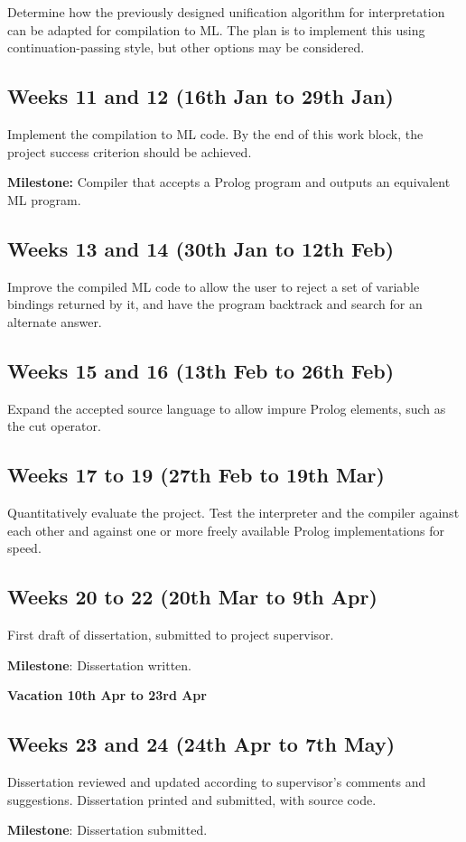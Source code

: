 \documentclass[12pt]{article}
\begin{document}
Determine how the previously designed unification algorithm for interpretation can be adapted for compilation to ML. The plan is to implement this using continuation-passing style, but other options may be considered.

\subsection*{Weeks 11 and 12 (16th Jan to 29th Jan)}

Implement the compilation to ML code. By the end of this work block, the project success criterion should be achieved.

\textbf{Milestone:} Compiler that accepts a Prolog program and outputs an equivalent ML program.

\subsection*{Weeks 13 and 14 (30th Jan to 12th Feb)}

Improve the compiled ML code to allow the user to reject a set of variable bindings returned by it, and have the program backtrack and search for an alternate answer.

\subsection*{Weeks 15 and 16 (13th Feb to 26th Feb)}

Expand the accepted source language to allow impure Prolog elements, such as the cut operator.

\subsection*{Weeks 17 to 19 (27th Feb to 19th Mar)}

Quantitatively evaluate the project. Test the interpreter and the compiler against each other and against one or more freely available Prolog implementations for speed.

\subsection*{Weeks 20 to 22 (20th Mar to 9th Apr)}

First draft of dissertation, submitted to project supervisor.

\textbf{Milestone}: Dissertation written.

\textbf{Vacation 10th Apr to 23rd Apr}

\subsection*{Weeks 23 and 24 (24th Apr to 7th May)}

Dissertation reviewed and updated according to supervisor's comments and suggestions. Dissertation printed and submitted, with source code.

\textbf{Milestone}: Dissertation submitted.
\end{document}

